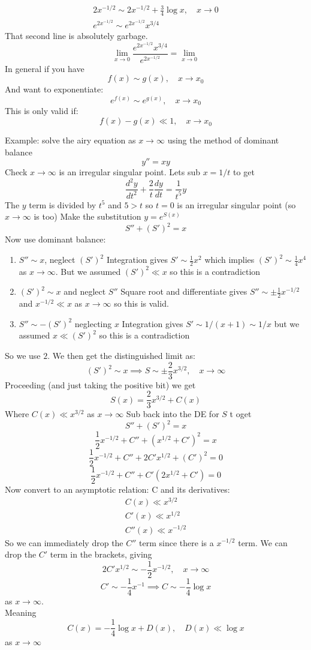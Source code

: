 \documentclass{/home/janmebows/Documents/LatexTemplates/myassignment}
\begin{document}
\begin{align*}
     2x^{-1/2} \sim 2x^{-1/2} + \frac34 \log x, \quad x\to 0\\
     e^{2x^{-1/2}} \sim e^{2x^{-1/2}} x^{3/4}
\end{align*}
That second line is absolutely garbage.
\[\lim_{x\to 0} \frac{e^{2x^{-1/2}}x^{3/4}}{e^{2x^{-1/2}} } = \lim_{x\to 0}\]
In general if you have 
\[f(x) \sim g(x), \quad x\to x_0\]
And want to exponentiate:
\[e^{f(x)} \sim e^{g(x)}, \quad x\to x_0\]
This is only valid if:
\[f(x) - g(x) \ll 1,\quad x\to x_0\]


Example: solve the airy equation as $x\to \infty$ using the method of dominant balance
\[y'' = xy\]
Check $x\to \infty$ is an irregular singular point. Lets sub $x=1/t$ to get
\[\frac{d^2y}{dt^2} + \frac2t \frac{dy}{dt} = \frac1{t^5}y\]
The $y$ term is divided by $t^5$ and $5>t$ so $t=0$ is an irregular singular point (so $x \to \infty$ is too)
Make the substitution $y = e^{S(x)}$
\[S'' + (S')^2 = x\]
Now use dominant balance:
\begin{enumerate}
    \item $S''\sim x$, neglect $(S')^2$
    Integration gives $S' \sim \frac12 x^2$ which implies $(S')^2 \sim \frac14 x^4$ as $x\to \infty$. But we assumed $(S')^2 \ll x$ so this is a contradiction
    \item $(S')^2 \sim x$ and neglect $S''$
    Square root and differentiate gives $S'' \sim \pm \frac12 x^{-1/2}$ and $x^{-1/2} \ll x$ as $x\to \infty$ so this is valid.
    \item $S'' \sim -(S')^2$ neglecting $x$
    Integration gives $S'\sim 1/(x+1) \sim 1/x$ but we assumed $x \ll (S')^2$ so this is a contradiction
\end{enumerate}
So we use $2$. 
We then get the distinguished limit as:
\[(S')^2 \sim x \implies S \sim \pm \frac23 x^{3/2}, \quad x\to \infty\]
Proceeding (and just taking the positive bit) we get
\[S(x) = \frac23 x^{3/2} + C(x)\]
Where $C(x) \ll x^{3/2}$ as $x\to\infty$
Sub back into the DE for $S$ t oget
\[S'' + (S')^2 = x\]
\[\frac12 x^{-1/2} + C'' + (x^{1/2} + C' )^2 = x\]
\[\frac12 x^{-1/2} + C'' + 2C'x^{1/2} + (C')^2=0\]
\[\frac12 x^{-1/2} + C'' + C'(2x^{1/2} + C')=0\]
Now convert to an asymptotic relation:
C and its derivatives:
\begin{align*}
    C(x) \ll x^{3/2}\\
    C'(x) \ll x^{1/2}\\
    C''(x) \ll x^{-1/2}
\end{align*}
So we can immediately drop the $C''$ term since there is a $x^{-1/2}$ term. We can drop the $C'$ term in the brackets, giving
\[2C' x^{1/2} \sim - \frac12 x^{-1/2}, \quad x\to \infty\]
\[C' \sim -\frac14 x^{-1} \implies C \sim - \frac14 \log x\]
as $x\to \infty$.\\
Meaning
\[C(x) = -\frac14 \log x + D(x), \quad D(x) \ll \log x\]
as $x\to \infty$
\end{document}
